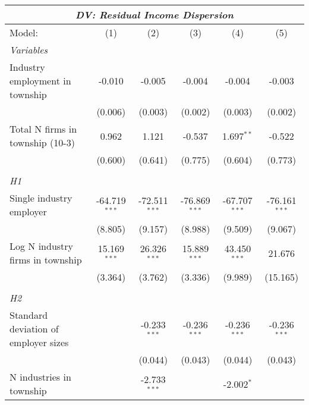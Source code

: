 \begingroup
\centering
\begin{tabular}{lccccc}
   \tabularnewline \multicolumn{6}{c}{\textit{DV: Residual Income Dispersion}} \\ \midrule \midrule
   Model:                               & (1)             & (2)             & (3)             & (4)             & (5)\\  
   \midrule
   \emph{Variables}\\
   Industry employment in township      & -0.010          & -0.005          & -0.004          & -0.004          & -0.003\\   
                                        & (0.006)         & (0.003)         & (0.002)         & (0.003)         & (0.002)\\   
   Total N firms in township (10-3)     & 0.962           & 1.121           & -0.537          & 1.697$^{**}$    & -0.522\\   
                                        & (0.600)         & (0.641)         & (0.775)         & (0.604)         & (0.773)\\   
\hdashline %
\\[0.1ex] %
\emph{H1} \\ 
   Single industry employer             & -64.719$^{***}$ & -72.511$^{***}$ & -76.869$^{***}$ & -67.707$^{***}$ & -76.161$^{***}$\\   
                                        & (8.805)         & (9.157)         & (8.988)         & (9.509)         & (9.067)\\   
   Log N industry firms in township     & 15.169$^{***}$  & 26.326$^{***}$  & 15.889$^{***}$  & 43.450$^{***}$  & 21.676\\   
                                        & (3.364)         & (3.762)         & (3.336)         & (9.989)         & (15.165)\\   
\hdashline %
\\[0.1ex] %
\emph{H2} \\ 
   Standard deviation of employer sizes &                 & -0.233$^{***}$  & -0.236$^{***}$  & -0.236$^{***}$  & -0.236$^{***}$\\   
                                        &                 & (0.044)         & (0.043)         & (0.044)         & (0.043)\\   
   N industries in township             &                 & -2.733$^{***}$  &                 & -2.002$^{*}$    &   \\   

\end{tabular}
